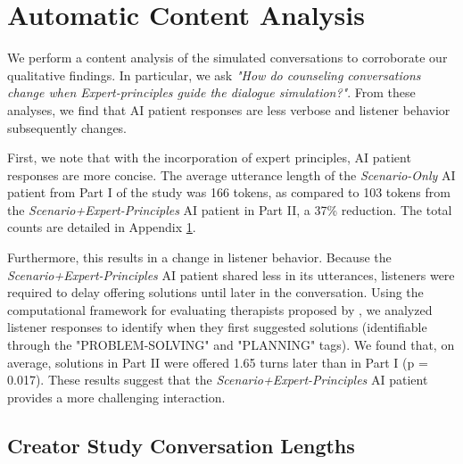 \documentclass[11pt]{article}
\newcommand{\diyi}[1]{\ifthenelse{\boolean{showcomments}}{\textcolor{blue}{[#1 —diyi]}}{}}
\begin{document}
\section{Automatic Content Analysis} \label{sec:autoanalyses}
We perform a content analysis of the simulated conversations to corroborate our qualitative findings. In particular, we ask \textit{"How do counseling conversations change when Expert-principles guide the dialogue simulation?"}. From these analyses, we find that AI patient responses are less verbose and listener behavior subsequently changes. 

First, we note that with the incorporation of expert principles, AI patient responses are more concise. The average utterance length of the \textit{Scenario-Only} AI patient from Part I of the study was 166 tokens, as compared to 103 tokens from the \textit{Scenario+Expert-Principles} AI patient in Part II, a 37\% reduction. The total counts are detailed in Appendix \ref{sec:autoanalyses}. 

Furthermore, this results in a change in listener behavior. Because the \textit{Scenario+Expert-Principles} AI patient shared less in its utterances, listeners were required to delay offering solutions until later in the conversation. Using the computational framework for evaluating therapists proposed by \citet{chiu2024computational}, we analyzed listener responses to identify when they first suggested solutions (identifiable through the "PROBLEM-SOLVING" and "PLANNING" tags). We found that, on average, solutions in Part II were offered 1.65 turns later than in Part I (p = 0.017). These results suggest that the \textit{Scenario+Expert-Principles} AI patient provides a more challenging interaction. 




\subsection{Creator Study Conversation Lengths}
\end{document}
